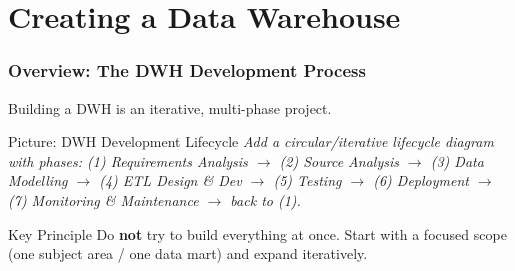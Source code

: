 \section{Creating a Data Warehouse}

\begin{frame}
  \frametitle{Overview: The DWH Development Process}

  Building a DWH is an iterative, multi-phase project.

  \begin{alertblock}{Picture: DWH Development Lifecycle}
    \textit{Add a circular/iterative lifecycle diagram with phases:
    (1) Requirements Analysis $\rightarrow$ (2) Source Analysis
    $\rightarrow$ (3) Data Modelling $\rightarrow$ (4) ETL Design \& Dev
    $\rightarrow$ (5) Testing $\rightarrow$ (6) Deployment
    $\rightarrow$ (7) Monitoring \& Maintenance $\rightarrow$ back to (1).}
  \end{alertblock}

  \begin{block}{Key Principle}
    Do \textbf{not} try to build everything at once.
    Start with a focused scope (one subject area / one data mart)
    and expand iteratively.
  \end{block}

\end{frame}

